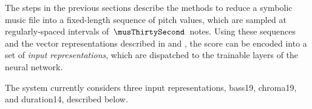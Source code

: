 
The steps in the previous sections describe the methods to
reduce a symbolic music file into a fixed-length sequence of
pitch values, which are sampled at regularly-spaced
intervals of $\, \musThirtySecond \,$ notes. Using these
sequences and the vector representations described in
 and
, the score can be encoded into
a set of \emph{input representations}, which are dispatched
to the trainable layers of the neural network. 

The system currently considers three input representations,
\gls{bass19}, \gls{chroma19}, and \gls{duration14},
described below.



